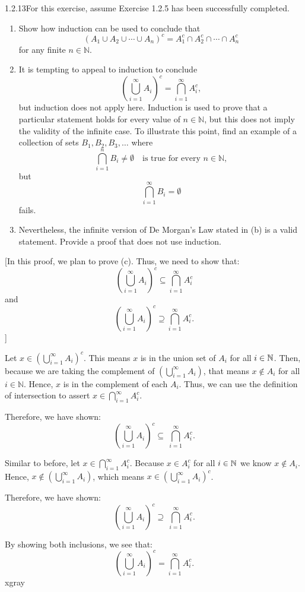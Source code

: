 
\begin{exercise}
    {1.2.13}For this exercise, assume Exercise 1.2.5 has been successfully completed.
    \begin{enumerate}[label=(\alph*)]
        \item Show how induction can be used to conclude that
        $$
        (A_1 \cup A_2 \cup \cdots \cup A_n)^c = A_1^c \cap A_2^c \cap \cdots \cap A_n^c
        $$
        for any finite $n \in \mathbb{N}$.
    
        \item It is tempting to appeal to induction to conclude
        $$
        \left( \bigcup_{i=1}^{\infty} A_i \right)^c = \bigcap_{i=1}^{\infty} A_i^c,
        $$
        but induction does not apply here. Induction is used to prove that a particular statement holds for every value of $n \in \mathbb{N}$, but this does not imply the validity of the infinite case. To illustrate this point, find an example of a collection of sets $B_1, B_2, B_3, \dots$ where
        $$
        \bigcap_{i=1}^{n} B_i \neq \emptyset \quad \text{is true for every } n \in \mathbb{N},
        $$
        but
        $$
        \bigcap_{i=1}^{\infty} B_i = \emptyset
        $$
        fails.
    
        \item Nevertheless, the infinite version of De Morgan’s Law stated in (b) is a valid statement. Provide a proof that does not use induction.
    \end{enumerate}
\end{exercise}
\newpage
\sbseteqpf%
%
[In this proof, we plan to prove (c). Thus, we need to show that:
$$
\left( \bigcup_{i=1}^{\infty} A_i \right)^c \subseteq \bigcap_{i=1}^{\infty} A_i^c
$$
and
$$
\left( \bigcup_{i=1}^{\infty} A_i \right)^c \supseteq \bigcap_{i=1}^{\infty} A_i^c.
$$]%
%
{Let $x \in \left( \bigcup_{i=1}^{\infty} A_i \right)^c$. This means $x$ is in the union set of $A_i$ for all $i \in \mathbb{N}$. Then, because we are taking the complement of $\left( \bigcup_{i=1}^{\infty} A_i \right)$, that means $x \notin A_i$ for all $i \in \mathbb{N}$. Hence, $x$ is in the complement of each $A_i$. Thus, we can use the definition of intersection to assert $x \in \bigcap_{i=1}^{\infty} A_i^c$.

Therefore, we have shown:
$$
\left( \bigcup_{i=1}^{\infty} A_i \right)^c \subseteq \ \bigcap_{i=1}^{\infty} A_i^c.
$$}%
%
%
%
{Similar to before, let $x \in \bigcap_{i=1}^{\infty} A_i^c$. Because $x \in A^c_i$ for all $i \in \mathbb{N}$ we know $x \notin A_i$. Hence, $x \notin \left(\bigcup_{i=1}^{\infty} A_i\right)$, which means $x \in \left( \bigcup_{i=1}^{\infty} A_i \right)^c$.

Therefore, we have shown:
$$
\left( \bigcup_{i=1}^{\infty} A_i \right)^c \supseteq \ \bigcap_{i=1}^{\infty} A_i^c.
$$}%
%
%
{By showing both inclusions, we see that:
$$
\left( \bigcup_{i=1}^{\infty} A_i \right)^c = \bigcap_{i=1}^{\infty} A_i^c.
$$
}%
%
%
{xgray}

